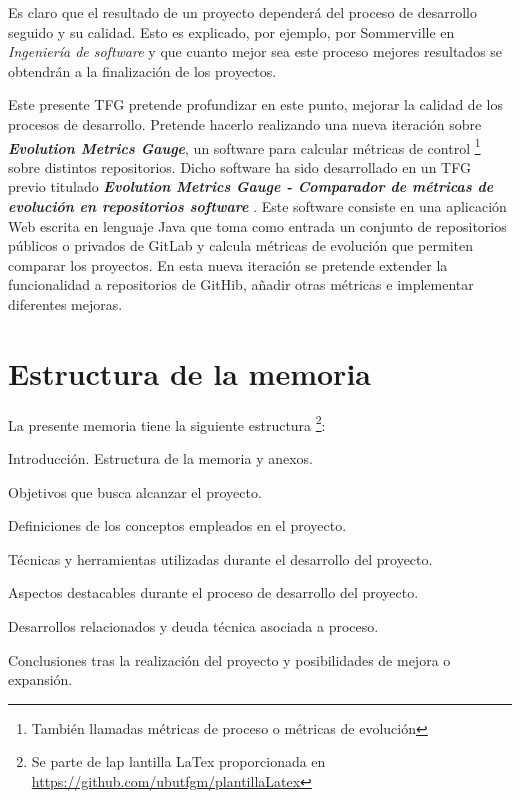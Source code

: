 Es claro que el resultado de un proyecto dependerá del proceso de desarrollo seguido y su calidad. Esto es explicado, por ejemplo, por Sommerville en \textit{Ingeniería de software} \cite{sommerville_ingenierisoftware_2002} y que cuanto mejor sea este proceso mejores resultados se obtendrán a la finalización de los proyectos.

Este presente TFG pretende profundizar en este punto, mejorar la calidad de los procesos de desarrollo. Pretende hacerlo realizando una nueva iteración sobre \textit{\textbf{Evolution Metrics Gauge}}, un software para calcular métricas de control \footnote{También llamadas métricas de proceso o métricas de evolución} sobre distintos repositorios.
Dicho software ha sido desarrollado en un TFG previo titulado \textit{\textbf{Evolution Metrics Gauge - Comparador de métricas de evolución en repositorios software}} \cite{TFGPrevio}. Este software consiste en una aplicación Web escrita en lenguaje Java que toma como entrada un conjunto de repositorios públicos o privados de GitLab y calcula métricas de evolución que permiten comparar los proyectos.
En esta nueva iteración se pretende extender la funcionalidad a repositorios de GitHib, añadir otras métricas e implementar diferentes mejoras.




\section{Estructura de la memoria}

La presente memoria tiene la siguiente estructura \footnote{Se parte de lap lantilla LaTex proporcionada en \url{https://github.com/ubutfgm/plantillaLatex}}:

\begin{description}
	\tightlist
	\item[Introducción.] Introducción. Estructura de la memoria y anexos.
	\item[Objetivos del proyecto.] Objetivos que busca alcanzar el proyecto.
	\item[Conceptos teóricos.] Definiciones de los conceptos empleados en el proyecto.
	\item[Técnicas y herramientas.] Técnicas y herramientas utilizadas durante el desarrollo del proyecto.
	\item[Aspectos relevantes del desarrollo.] Aspectos destacables durante el proceso de desarrollo del proyecto.
	\item[Trabajos relacionados y \textit{debt process}.] Desarrollos relacionados y deuda técnica asociada a proceso.
	\item[Conclusiones y líneas de trabajo futuras.] Conclusiones tras la realización del proyecto y posibilidades de mejora o expansión.
\end{description}

